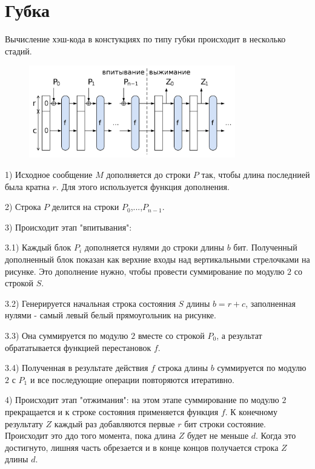 \documentclass[a4paper,12pt]{article}
\theoremstyle{plain} %
\theoremstyle{definition} %
\theoremstyle{remark} %
\begin{document}
	\section{Губка} 
	
	Вычисление хэш-кода в констукциях по типу губки происходит в несколько стадий.
	
	\begin{figure}[h!]
		\centering
		\includegraphics[width=90mm]{2.png}
	\end{figure}

	1) Исходное сообщение $M$ дополняется до строки $P$ так, чтобы длина последнией была кратна $r$. Для этого используется функция дополнения.
	
	2) Строка $P$ делится на строки $P_0$,...,$P_{n-1}$.
	
	3) Происходит этап "впитывания":
	
	3.1) Каждый блок $P_i$ дополняется нулями до строки длины $b$ бит. Полученный дополненный блок показан как верхние входы над вертикальными стрелочками на рисунке. Это дополнение нужно, чтобы провести суммирование по модулю $2$ со строкой $S$.
	
	3.2) Генерируется начальная строка состояния $S$ длины $b=r+c$, заполненная нулями - самый левый белый прямоугольник на рисунке. 
	
	3.3) Она суммируется по модулю $2$ вместе со строкой $P_0$, а результат обрататывается функцией перестановок $f$.
	
	3.4) Полученная в результате действия $f$ строка длины $b$ суммируется по модулю $2$ с $P_1$ и все последующие операции повторяются итеративно. 
	
	4) Происходит этап "отжимания": на этом этапе суммирование по модулю $2$ прекращается и к строке состояния применяется функция $f$. К конечному результату $Z$ каждый раз добавляются первые $r$ бит строки состояние. Происходит это ддо того момента, пока длина $Z$ будет не меньше $d$. Когда это достигнуто, лишняя часть обрезается и в конце концов получается строка $Z$ длины $d$.
	
	
	\newpage
	
\end{document}
